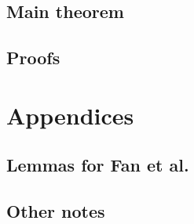 \documentclass{article}
\begin{document}
\subsection{Main theorem}

\subsection{Proofs}





\section{Appendices}
\subsection{Lemmas for Fan et al.}

\subsection{Other notes}

\end{document}
